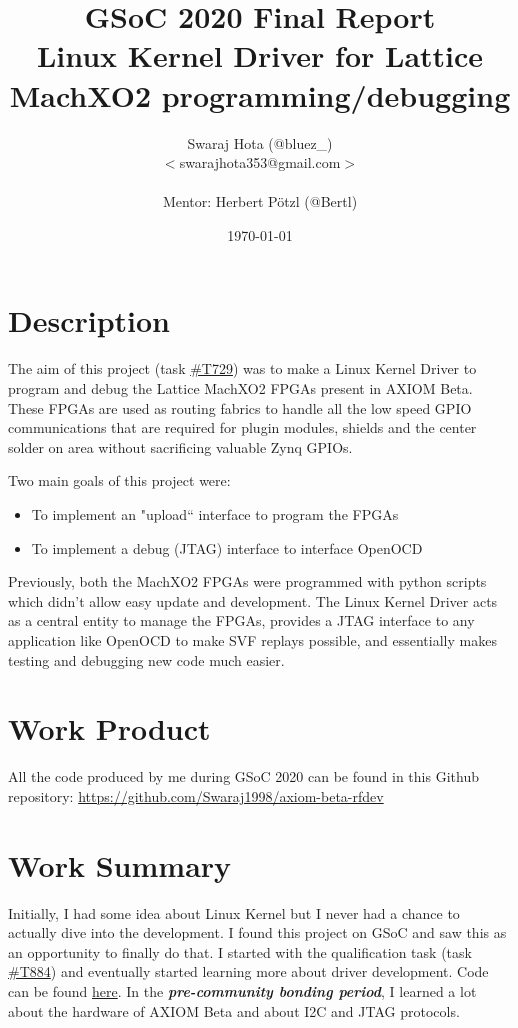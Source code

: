 \documentclass{article}
\title{{\Huge GSoC 2020 Final Report} \\
{\vfill\huge Linux Kernel Driver for Lattice MachXO2 programming/debugging}}
\author{Swaraj Hota (@bluez\_) \\
$<$swarajhota353@gmail.com$>$ \\
\\Mentor: Herbert P\"{o}tzl (@Bertl)}
\date{\vfill\today}
\begin{document}
 
\selectfont
\maketitle 
\newpage
\tableofcontents
\newpage

\section{Description}
The aim of this project 
(task \href{https://lab.apertus.org/T729}{\#T729})
was to make a Linux Kernel Driver to program and
debug the Lattice MachXO2 FPGAs present in AXIOM Beta. These FPGAs are used as
routing fabrics to handle all the low speed GPIO communications that are required
for plugin modules, shields and the center solder on area without sacrificing valuable
Zynq GPIOs.\newline

Two main goals of this project were:
\begin{itemize}
\item To implement an "upload`` interface to program the FPGAs
\item To implement a debug (JTAG) interface to interface OpenOCD\newline
\end{itemize}

Previously, both the MachXO2 FPGAs were programmed with python scripts which
didn't allow easy update and development.
The Linux Kernel Driver acts as a central entity to manage the FPGAs, provides
a JTAG interface to any application like OpenOCD to make SVF replays possible,
and essentially makes testing and debugging new code much easier.

\section{Work Product}
All the code produced by me during GSoC 2020 can be found in this Github repository:
\newline
\url{https://github.com/Swaraj1998/axiom-beta-rfdev}

\newpage

\section{Work Summary}

Initially, I had some idea about Linux Kernel but I never had a chance to
actually dive into the development. I found this project on GSoC and saw this
as an opportunity to finally do that. I started with the qualification task
(task \href{https://lab.apertus.org/T884}{\#T884})
and eventually started learning more about driver development.
Code can be found
\href{https://github.com/Swaraj1998/apertus-kernel-challenge}{here}.
In the \emph{\textbf{pre-community bonding period}},
I learned a lot about the hardware of AXIOM Beta and about I2C and JTAG protocols.\newline
\end{document}

